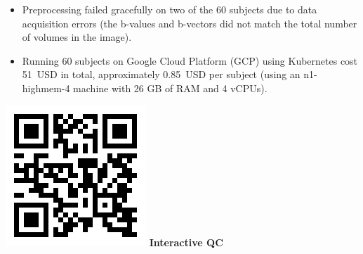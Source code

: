 \documentclass[a0paper,portrait,fontscale=0.395]{baposter}
\begin{document}
\begin{poster}
{\begin{minipage}[c]{0.6\linewidth}
\begin{itemize}[noitemsep]
    \item Preprocessing failed gracefully on two of the 60 subjects due to data acquisition errors (the b-values and b-vectors did not match the total number of volumes in the image).
    \item Running 60 subjects on Google Cloud Platform (GCP) using Kubernetes cost 51~USD in total, approximately 0.85~USD per subject (using an n1-highmem-4 machine with 26 GB of RAM and 4 vCPUs).
\end{itemize}
\end{minipage}
\begin{minipage}[c]{0.4\linewidth}
    \centering
    \null\hfill
    \begin{minipage}[t]{0.285\linewidth}
    \centering
    \includegraphics[height=\linewidth, valign=c]{dmriprep_qc_dynamic_qr.png}
    \textbf{Interactive QC}
    \end{minipage}
    \hfill
    \begin{minipage}[t]{0.285\linewidth}
    \centering

\end{minipage}
\end{minipage}}
\end{poster}
\end{document}

